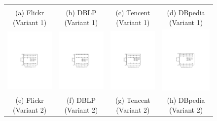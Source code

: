 \begin{figure}[htb]
\begin{tabular}{c c c c}
\begin{minipage}{3.325cm}
  \end{minipage}
  \\
  \small (a) Flickr (Variant 1)
  &
  \small (b) DBLP (Variant 1)
  &
  \small (c) Tencent (Variant 1)
  &
  \small (d) DBpedia (Variant 1)
      \\
  \begin{minipage}{3.325cm}
  \includegraphics[width=3.725cm]{figures/flickrv2}
  \end{minipage}
  &
  \begin{minipage}{3.325cm}
  \includegraphics[width=3.725cm]{figures/dblpv2}
  \end{minipage}
  &
  \begin{minipage}{3.325cm}
  \includegraphics[width=3.725cm]{figures/tencentv2}
  \end{minipage}
  &
  \begin{minipage}{3.325cm}
  \includegraphics[width=3.725cm]{figures/dbpediav2}
  \end{minipage}
  \\
  \small (e) Flickr (Variant 2)
  &
  \small (f) DBLP (Variant 2)
  &
  \small (g) Tencent (Variant 2)
  &
  \small (h) DBpedia (Variant 2)
\\



\end{tabular}
\end{figure}
